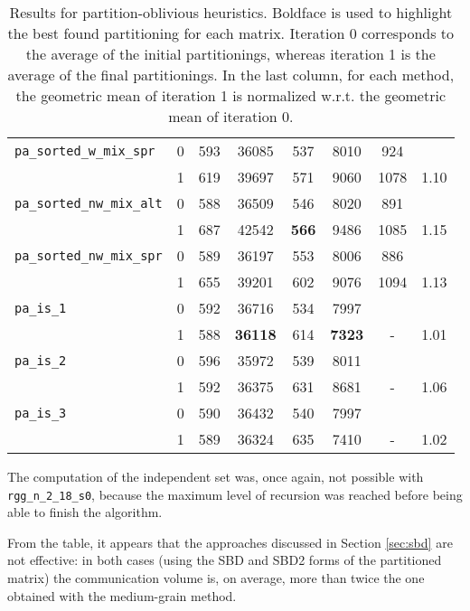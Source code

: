 \begin{table}[h]
\begin{tabular}{|l|c||c|c|c|c|c||c|}
		\verb|pa_sorted_w_mix_spr| & 0 &  593 & 36085 &  537 & 8010 & 924 & \\ %
		& 1 & 619 & 39697 & 571 &  9060 & 1078 & 1.10 \\ \hline %
		
		\verb|pa_sorted_nw_mix_alt| & 0 & 588 & 36509 & 546 & 8020 & 891 & \\ %
		& 1 &  687 & 42542 & \textbf{566} & 9486 & 1085 & 1.15 \\ \hline %
		
		\verb|pa_sorted_nw_mix_spr| & 0 & 589 & 36197 & 553 & 8006  & 886 & \\ %
		& 1 &  655 & 39201 & 602 & 9076 & 1094 & 1.13 \\ \hline %
		
		\verb|pa_is_1| & 0 & 592 & 36716 & 534 & 7997 & & \\ %
		& 1 & 588 & \textbf{36118} & 614 & \textbf{7323} & - & 1.01 \\ \hline %
		
		\verb|pa_is_2| & 0 & 596 & 35972 &  539 & 8011 &  & \\ %
		& 1 & 592 & 36375 &  631 & 8681 & - & 1.06 \\ \hline %
		
		\verb|pa_is_3| & 0 & 590 & 36432 & 540 & 7997 & & \\ %
		& 1 & 589 & 36324 & 635 & 7410 & - & 1.02\\ \hline %

	\end{tabular}
	\caption{Results for partition-oblivious heuristics. Boldface is used to highlight the best found partitioning for each matrix. Iteration 0 corresponds to the average of the initial partitionings, whereas iteration 1 is the average of the final partitionings. In the last column, for each method, the geometric mean of iteration 1 is normalized w.r.t. the geometric mean of iteration 0.} \label{tab:preliminary_pa}
\end{table}

The computation of the independent set was, once again, not possible with \verb|rgg_n_2_18_s0|, because the maximum level of recursion was reached before being able to finish the algorithm.

From the table, it appears that the approaches discussed in Section \ref{sec:sbd} are not effective: in both cases (using the SBD and SBD2 forms of the partitioned matrix) the communication volume is, on average, more than twice the one obtained with the medium-grain method. 

